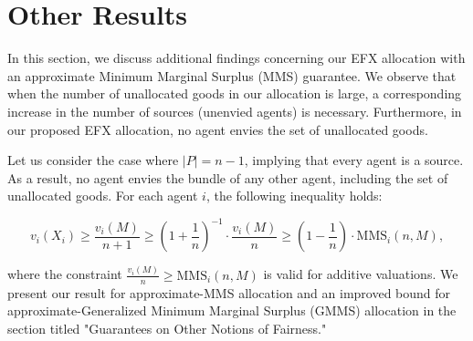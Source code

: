 \documentclass{article}
\begin{document}
\section{Other Results}

In this section, we discuss additional findings concerning our EFX allocation with an approximate Minimum Marginal Surplus (MMS) guarantee. We observe that when the number of unallocated goods in our allocation is large, a corresponding increase in the number of sources (unenvied agents) is necessary. Furthermore, in our proposed EFX allocation, no agent envies the set of unallocated goods.

Let us consider the case where $|P| = n - 1$, implying that every agent is a source. As a result, no agent envies the bundle of any other agent, including the set of unallocated goods. For each agent $i$, the following inequality holds:

\[
v_i(X_i) \geq \frac{v_i(M)}{n + 1} \geq \left(1 + \frac{1}{n}\right)^{-1} \cdot \frac{v_i(M)}{n} \geq \left(1 - \frac{1}{n}\right) \cdot \text{MMS}_i(n, M),
\]

where the constraint $\frac{v_i(M)}{n} \geq \text{MMS}_i(n, M)$ is valid for additive valuations. We present our result for approximate-MMS allocation and an improved bound for approximate-Generalized Minimum Marginal Surplus (GMMS) allocation in the section titled "Guarantees on Other Notions of Fairness."
\end{document}
